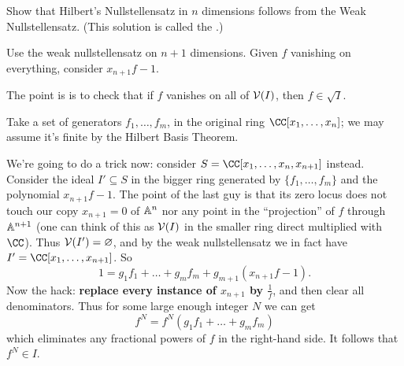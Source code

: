 \begin{problem}
	\kurumi
	Show that Hilbert's Nullstellensatz in $n$ dimensions
	follows from the Weak Nullstellensatz.
	(This solution is called the .)
	\begin{hint}
		Use the weak nullstellensatz on $n+1$ dimensions.
		Given $f$ vanishing on everything,
		consider $x_{n+1}f-1$. 
	\end{hint}
	\begin{hint}
		The point is is to check that if $f$ vanishes on all of $\mathcal V(I)$,
		then $f \in \sqrt I$.

		Take a set of generators $f_1, \dots, f_m$,
		in the original ring $\CC[x_1, \dots, x_n]$;
		we may assume it's finite by the Hilbert Basis Theorem.

		We're going to do a trick now:
		consider $S = \CC[x_1, \dots, x_n, x_{n+1}]$ instead.
		Consider the ideal $I' \subseteq S$ in the bigger ring
		generated by $\{f_1, \dots, f_m\}$ and the polynomial $x_{n+1} f - 1$.
		The point of the last guy is that its zero locus
		does not touch our copy $x_{n+1}=0$ of $\mathbb A^n$
		nor any point in the ``projection'' of $f$ through $\mathbb A^{n+1}$
		(one can think of this as $\mathcal V(I)$ in the smaller ring
		direct multiplied with $\CC$).
		Thus $\mathcal V(I') = \varnothing$, and by the weak nullstellensatz
		we in fact have $I' = \CC[x_1, \dots, x_{n+1}]$.
		So
		\[ 1 = g_1f_1 + \dots + g_mf_m + g_{m+1} \left( x_{n+1}f-1 \right). \]
		Now the hack: \textbf{replace every instance of $x_{n+1}$ by $\frac 1f$},
		and then clear all denominators.
		Thus for some large enough integer $N$ we can get
		\[ f^N = f^N(g_1f_1 + \dots + g_mf_m) \]
		which eliminates any fractional powers of $f$ in the right-hand side.
		It follows that $f^N \in I$.
	\end{hint}
\end{problem}


